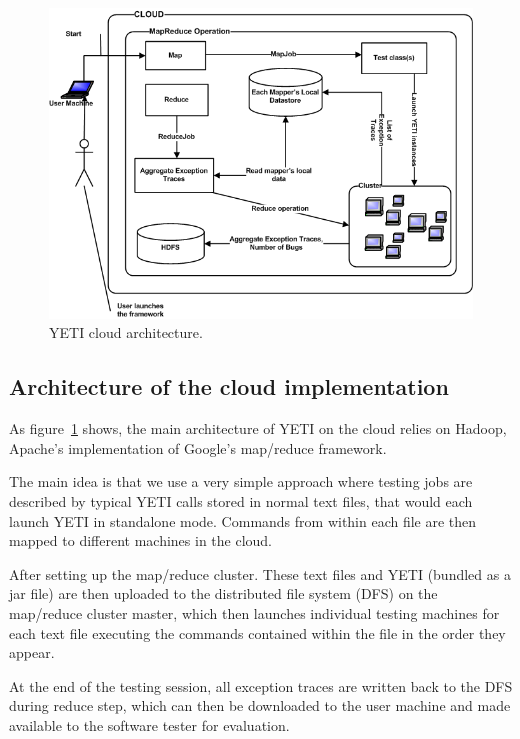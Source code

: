 \begin{figure}[h]
\begin{center}
\includegraphics[width=\columnwidth]{images/YetiCloud.png}
\end{center}
\caption{YETI cloud architecture.}\label{fig:architecture}
\end{figure}


\subsection{Architecture of the cloud implementation}

As figure~\ref{fig:architecture} shows, the main architecture of YETI on the cloud 
relies on Hadoop, Apache's implementation of Google's map/reduce framework. 

The main idea is that we use a very simple approach where testing jobs 
are described by typical YETI calls stored in normal text files, that would each launch YETI in standalone mode. 
Commands from within each file are then mapped to different machines in the cloud. 

After setting up the map/reduce cluster. These text files and YETI (bundled as a jar file) are then uploaded to the 
distributed file system (DFS) on the map/reduce cluster master, which then launches individual testing machines 
for each text file executing the commands contained within the file in the order they appear.

At the end of the testing session, all exception traces are written back to the DFS during reduce step, which can then be downloaded to the 
user machine and made available to the software tester for evaluation.


